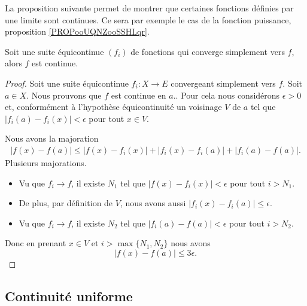 La proposition suivante permet de montrer que certaines fonctions définies par une limite sont continues. Ce sera par exemple le cas de la fonction puissance, proposition \ref{PROPooUQNZooSSHLqr}.
\begin{proposition}     \label{PROPooICNNooAMjcut}
    Soit une suite équicontinue \( (f_i)\) de fonctions qui converge simplement vers \( f\), alors \( f\) est continue.
\end{proposition}

\begin{proof}
    Soit une suite équicontinue \( f_i\colon X\to E\) convergeant simplement vers \( f\). Soit \( a\in X\). Nous prouvons que \( f\) est continue en \( a.\). Pour cela nous considérons \( \epsilon>0\) et, conformément à l'hypothèse équicontinuité un voisinage \( V\) de \( a\) tel que \( | f_i(a)-f_i(x) |<\epsilon\) pour tout \( x\in V\).

    Nous avons la majoration
    \begin{subequations}
        \begin{align}
            | f(x)-f(a) |\leq | f(x)-f_i(x) |+| f_i(x)-f_i(a) |+| f_i(a)-f(a) |.
        \end{align}
    \end{subequations}
    Plusieurs majorations.
    \begin{itemize}
        \item 
            Vu que \( f_i\to f\), il existe \( N_1\) tel que \( | f(x)-f_i(x) |<\epsilon\) pour tout \( i>N_1\).
        \item
            De plus, par définition de \( V\), nous avons aussi \( | f_i(x)-f_i(a) |\leq \epsilon\).
        \item
            Vu que \( f_i\to f\), il existe \( N_2\) tel que \( | f_i(a)-f(a) |<\epsilon\) pour tout \( i>N_2\).
    \end{itemize}
    Donc en prenant \( x\in V\) et \( i>\max\{ N_1,N_2 \}\) nous avons
    \begin{equation}
        | f(x)-f(a) |\leq 3\epsilon.
    \end{equation}
\end{proof}


\subsection{Continuité uniforme}

